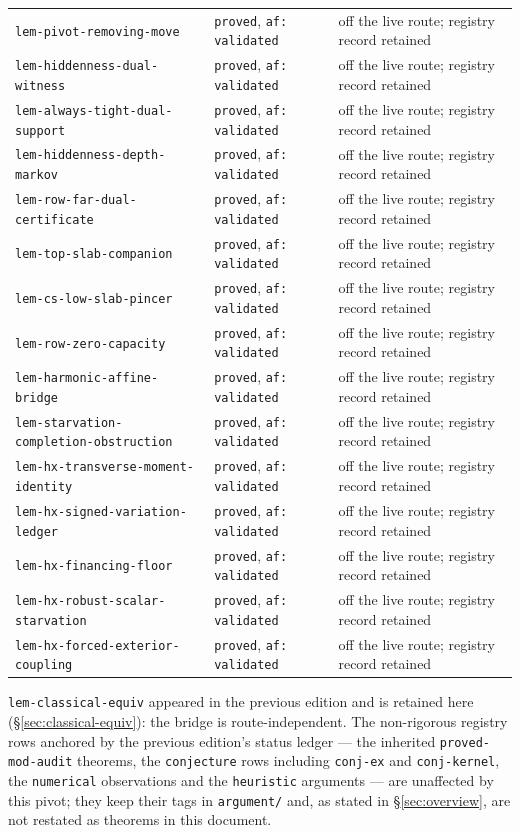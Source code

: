\begin{longtable}{@{}p{}p{}p{}@{}}
\texttt{lem-pivot-removing-move} & \texttt{proved}, \texttt{af: validated} & off the live route; registry record retained \\
\texttt{lem-hiddenness-dual-witness} & \texttt{proved}, \texttt{af: validated} & off the live route; registry record retained \\
\texttt{lem-always-tight-dual-support} & \texttt{proved}, \texttt{af: validated} & off the live route; registry record retained \\
\texttt{lem-hiddenness-depth-markov} & \texttt{proved}, \texttt{af: validated} & off the live route; registry record retained \\
\texttt{lem-row-far-dual-certificate} & \texttt{proved}, \texttt{af: validated} & off the live route; registry record retained \\
\texttt{lem-top-slab-companion} & \texttt{proved}, \texttt{af: validated} & off the live route; registry record retained \\
\texttt{lem-cs-low-slab-pincer} & \texttt{proved}, \texttt{af: validated} & off the live route; registry record retained \\
\texttt{lem-row-zero-capacity} & \texttt{proved}, \texttt{af: validated} & off the live route; registry record retained \\
\texttt{lem-harmonic-affine-bridge} & \texttt{proved}, \texttt{af: validated} & off the live route; registry record retained \\
\texttt{lem-starvation-completion-obstruction} & \texttt{proved}, \texttt{af: validated} & off the live route; registry record retained \\
\texttt{lem-hx-transverse-moment-identity} & \texttt{proved}, \texttt{af: validated} & off the live route; registry record retained \\
\texttt{lem-hx-signed-variation-ledger} & \texttt{proved}, \texttt{af: validated} & off the live route; registry record retained \\
\texttt{lem-hx-financing-floor} & \texttt{proved}, \texttt{af: validated} & off the live route; registry record retained \\
\texttt{lem-hx-robust-scalar-starvation} & \texttt{proved}, \texttt{af: validated} & off the live route; registry record retained \\
\texttt{lem-hx-forced-exterior-coupling} & \texttt{proved}, \texttt{af: validated} & off the live route; registry record retained \\
\bottomrule
\end{longtable}

\noindent
\texttt{lem-classical-equiv} appeared in the previous edition and is retained here
(\S\ref{sec:classical-equiv}): the bridge is route-independent. The non-rigorous registry
rows anchored by the previous edition's status ledger --- the inherited
\texttt{proved-mod-audit} theorems, the \texttt{conjecture} rows including
\texttt{conj-ex} and \texttt{conj-kernel}, the \texttt{numerical} observations and the
\texttt{heuristic} arguments --- are unaffected by this pivot; they keep their tags in
\texttt{argument/} and, as stated in \S\ref{sec:overview}, are not restated as theorems in
this document.
